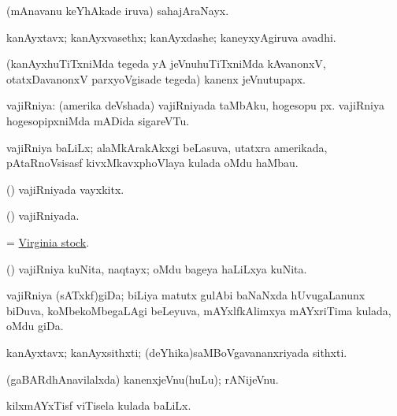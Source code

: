 \bentry
{} 
\gl{\nA}
\expl{}
\bmng
 (mAnavanu keYhAkade iruva) sahajAraNayx. 
\emng
\eentry

\bentry 
{} 
\gl{\nA}
\expl{}
\bmng
 kanAyxtavx; kanAyxvasethx; kanAyxdashe; kaneyxyAgiruva avadhi. 
\emng
\eentry

\bentry 
{}
\gl{\nA}
\expl{}
\bmng
 (kanAyxhuTiTxniMda tegeda yA jeVnuhuTiTxniMda kAvanonxV, otatxDavanonxV parxyoVgisade tegeda) kanenx jeVnutupapx. 
\emng
\eentry

\bentry 
{} 
\gl{\nA}
\expl{}
\bmng
 vajiRniya: 
\banum
{} (amerika deVshada) vajiRniyada taMbAku, hogesopu px. 
 vajiRniya hogesopipxniMda mADida sigareVTu. 
\eanum
\emng
\eentry

\bentry
{}
\gl{\nA}
\expl{}
\bmng
vajiRniya baLiLx; alaMkArakAkxgi beLasuva, utatxra amerikada, pAtaRnoVsisasf kivxMkavxphoVlaya kulada oMdu haMbau. 
\emng
\eentry

\bentry 
{} 
\gl{\nA}
\expl{}
\bmng
 (\ame) vajiRniyada vayxkitx. 
\emng
\eentry

\bentry
{} 
\gl{\gu}
\expl{}
\bmng
 (\ame) vajiRniyada. 
\emng
\eentry

\bentry
{}
\gl{\nA}
\expl{}
\bmng
 = \hyperlink{Virginia stock}{Virginia stock}. 
\emng
\eentry

\bentry
{}
\gl{\nA}
\expl{}
\bmng
 (\ame) vajiRniya kuNita, naqtayx; oMdu bageya haLiLxya kuNita. 
\emng
\eentry

\bentry 
{}
\gl{\nA}
\expl{}
\bmng
 vajiRniya (sATxkf)giDa; biLiya matutx gulAbi baNaNxda hUvugaLanunx biDuva, koMbekoMbegaLAgi beLeyuva, mAYxlfkAlimxya mAYxriTima kulada, oMdu giDa. 
\emng
\eentry

\bentry 
{} 
\gl{\nA}
\expl{}
\bmng
 kanAyxtavx; kanAyxsithxti; (deYhika)saMBoVgavananxriyada sithxti. 
\emng
\eentry

\bentry 
{}
\gl{\nA}
\expl{}
\bmng
 (gaBARdhAnavilalxda) kanenxjeVnu(huLu); rANijeVnu. 
\emng
\eentry

\bentry
{}
\gl{\nA}
\expl{}
\bmng
 kilxmAYxTisf viTisela kulada baLiLx. 
\emng
\eentry

